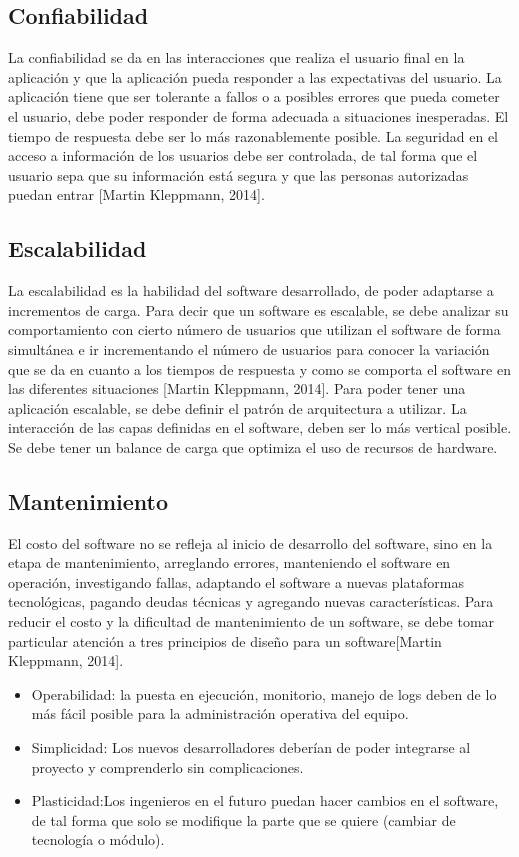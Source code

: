 \subsection{Confiabilidad}
\noindent La confiabilidad se da en las interacciones que realiza el usuario final en la aplicación y que la aplicación pueda responder a las expectativas del usuario. La aplicación tiene que ser tolerante a fallos o a posibles errores que pueda cometer el usuario, debe poder responder de forma adecuada a situaciones inesperadas. El tiempo de respuesta debe ser lo más razonablemente posible. La seguridad en el acceso a información de los usuarios debe ser controlada, de tal forma que el usuario sepa que su información está segura y que las personas autorizadas puedan entrar [Martin Kleppmann, 2014].


\subsection{Escalabilidad}
\noindent La escalabilidad es la habilidad del software desarrollado, de poder adaptarse a incrementos de carga. Para decir que un software es escalable, se debe analizar su comportamiento con cierto número de usuarios que utilizan el software de forma simultánea e ir incrementando el número de usuarios para conocer la variación que se da en cuanto a los tiempos de respuesta y como se comporta el software en las diferentes situaciones  [Martin Kleppmann, 2014].
\noindent Para poder tener una aplicación escalable, se debe definir el patrón de arquitectura a utilizar. La interacción de las capas definidas en el software, deben ser lo más vertical posible. Se debe tener un balance de carga que optimiza el uso de recursos de hardware. 

\subsection{Mantenimiento}
\noindent El costo del software no se refleja al inicio de desarrollo del software, sino en la etapa de mantenimiento, arreglando errores, manteniendo el software en operación, investigando fallas, adaptando el software a nuevas plataformas tecnológicas, pagando deudas técnicas y agregando nuevas características.
Para reducir el costo y la dificultad de mantenimiento de un software, se debe tomar particular atención a tres principios de diseño para un software[Martin Kleppmann, 2014].
\begin{itemize}
\item Operabilidad: la puesta en ejecución, monitorio, manejo de logs deben de lo más fácil posible para la administración operativa del equipo.
\item Simplicidad: Los nuevos desarrolladores deberían de poder integrarse al proyecto y comprenderlo sin complicaciones.
\item Plasticidad:Los ingenieros en el futuro puedan hacer cambios en el software, de tal forma que solo se modifique la parte que se quiere (cambiar de tecnología o módulo).
\end{itemize}

